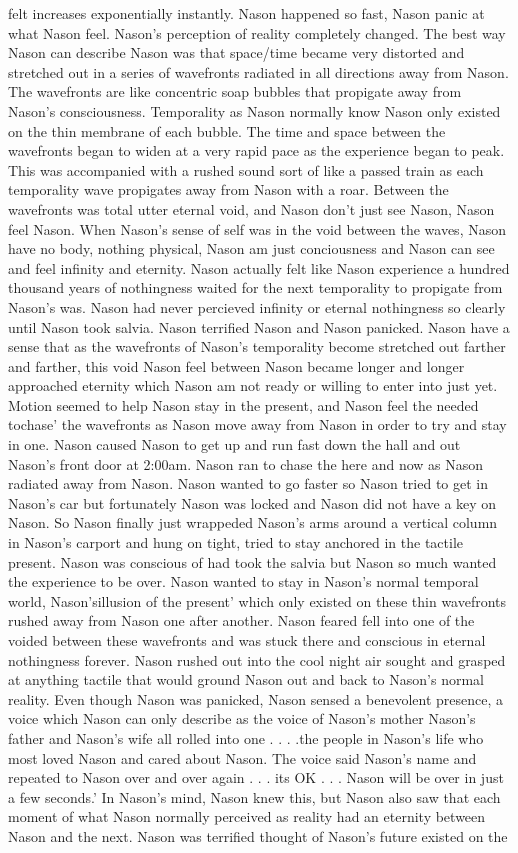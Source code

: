 \documentclass[12pt]{book}
\begin{document}
felt increases exponentially instantly. Nason happened so fast, Nason panic at what Nason feel. Nason's perception of reality completely changed. The best way Nason can describe Nason was that space/time became very distorted and stretched out in a series of wavefronts radiated in all directions away from Nason. The wavefronts are like concentric soap bubbles that propigate away from Nason's consciousness. Temporality as Nason normally know Nason only existed on the thin membrane of each bubble. The time and space between the wavefronts began to widen at a very rapid pace as the experience began to peak. This was accompanied with a rushed sound sort of like a passed train as each temporality wave propigates away from Nason with a roar. Between the wavefronts was total utter eternal void, and Nason don't just see Nason, Nason feel Nason. When Nason's sense of self was in the void between the waves, Nason have no body, nothing physical, Nason am just conciousness and Nason can see and feel infinity and eternity. Nason actually felt like Nason experience a hundred thousand years of nothingness waited for the next temporality to propigate from Nason's was. Nason had never percieved infinity or eternal nothingness so clearly until Nason took salvia. Nason terrified Nason and Nason panicked. Nason have a sense that as the wavefronts of Nason's temporality become stretched out farther and farther, this void Nason feel between Nason became longer and longer approached eternity which Nason am not ready or willing to enter into just yet. Motion seemed to help Nason stay in the present, and Nason feel the needed tochase' the wavefronts as Nason move away from Nason in order to try and stay in one. Nason caused Nason to get up and run fast down the hall and out Nason's front door at 2:00am. Nason ran to chase the here and now as Nason radiated away from Nason. Nason wanted to go faster so Nason tried to get in Nason's car but fortunately Nason was locked and Nason did not have a key on Nason. So Nason finally just wrappeded Nason's arms around a vertical column in Nason's carport and hung on tight, tried to stay anchored in the tactile present. Nason was conscious of had took the salvia but Nason so much wanted the experience to be over. Nason wanted to stay in Nason's normal temporal world, Nason'sillusion of the present' which only existed on these thin wavefronts rushed away from Nason one after another. Nason feared fell into one of the voided between these wavefronts and was stuck there and conscious in eternal nothingness forever. Nason rushed out into the cool night air sought and grasped at anything tactile that would ground Nason out and back to Nason's normal reality. Even though Nason was panicked, Nason sensed a benevolent presence, a voice which Nason can only describe as the voice of Nason's mother Nason's father and Nason's wife all rolled into one . . .  .the people in Nason's life who most loved Nason and cared about Nason. The voice said Nason's name and repeated to Nason over and over again . . . its OK . . .  Nason will be over in just a few seconds.' In Nason's mind, Nason knew this, but Nason also saw that each moment of what Nason normally perceived as reality had an eternity between Nason and the next. Nason was terrified thought of Nason's future existed on the 
\end{document}
